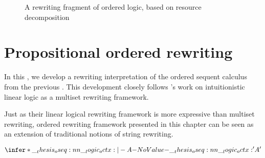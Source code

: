 \begin{figure}[tbp]

  \caption{A rewriting fragment of ordered logic, based on resource decomposition}\label{fig:ordered-rewriting:rewriting}
\end{figure}





\section{Propositional ordered rewriting}

In this , we develop a rewriting interpretation of the ordered sequent calculus from the previous .
This development closely follows \citeauthor{Cervesato+Scedrov:IC09}'s work on intuitionistic linear logic as a multiset rewriting framework.\autocite{Cervesato+Scedrov:IC09}

Just as their linear logical rewriting framework is more expressive than multiset rewriting, ordered rewriting framework presented in this chapter can be seen as an extension of traditional notions of string rewriting.


\begin{equation*}
  \infer*{\oseq{\octx |- A}}{
    \oseq{\octx' |- A'}}
\end{equation*}


